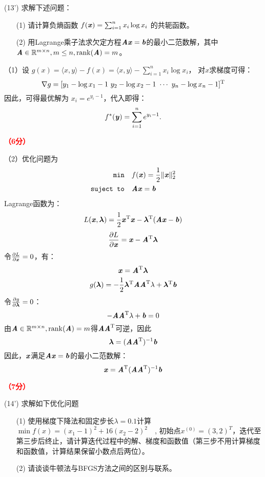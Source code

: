 \documentclass[12pt,a4paper,openany,twoside]{ctexbook}
\begin{document}
\begin{exercise}(13')
	求解下述问题：
	\begin{itemize}
		\item[(1)] 请计算负熵函数 $f(\Vx)=\sum_{i=1}^{n} x_i \log x_i$ 的共轭函数。
		
		
		\item [(2)] 用Lagrange乘子法求欠定方程$ \MA\Vx=\Vb $的最小二范数解，其中$ \MA\in\NR^{m\times n},m\leq n,\rank(\MA)=m $。
	\end{itemize}
\end{exercise}
\begin{Solution}
	（1）设 $g(x) = \langle x,y \rangle-f(x) = \langle x,y \rangle-\sum_{i=1}^{n} x_i \log x_i$，
	对$x$求梯度可得：
	\[
	\nabla g = [y_1-\log x_1 - 1~ y_2-\log x_2 - 1~ \cdots~ y_n-\log x_n - 1]\T
	\]
	因此，可得最优解为 $x_i = e^{y_i - 1}$，代入即得：
	\[
	f^* (\Vy) = \sum_{i=1}^{n} e^{y_i - 1}.
	\]
	
	\hfill \textcolor{red}{\textbf{（6分）}}
	
	（2）优化问题为\[ 	\begin{aligned}
		\texttt{min} \quad & f(\Vx)=\frac{1}{2}\Vert \Vx\Vert_{2}^2 \\
		\texttt{suject to} \quad & \MA\Vx=\Vb
	\end{aligned} \]
	Lagrange函数为：
	\[ L(\Vx,
	\Vlambda)=\frac{1}{2}\Vx\T\Vx-\Vlambda\T(\MA\Vx-\Vb) \]
	\[ \frac{\partial L}{\partial \Vx}= \Vx -\MA\T\Vlambda\]
	令$ \frac{\partial L}{\partial \Vx}=0 $，有：
	\[ \Vx=\MA\T\Vlambda \]
	\[ g(\Vlambda)=-\frac{1}{2}\Vlambda\T\MA\MA\T\lambda+\Vlambda\T\Vb \]
	令$ \frac{\partial g}{\partial \Vlambda}=0  $：
	\[ -\MA\MA\T\lambda+\Vb=0 \]
	由$ \MA\in\NR^{m\times n},\rank(\MA)=m $得$ \MA\MA\T $可逆，因此
	\[ \Vlambda=(\MA\MA\T)^{-1}\Vb \]
	因此，$ \Vx $满足$ \MA\Vx=\Vb $的最小二范数解： \[ \Vx=\MA\T(\MA\MA\T)^{-1}\Vb  \]
	
	\hfill \textcolor{red}{\textbf{（7分）}}
\end{Solution}

\begin{exercise}(14')
	求解如下优化问题
	\begin{itemize}
		\item [(1)] 使用梯度下降法和固定步长$\lambda =0.1$计算$\min f(x)=(x_{1}-1)^{2}+16(x_{2}-2)^{2} \quad $, 初始点$x^{(0)}=(3,2)^{T}$，迭代至第三步后终止，请计算迭代过程中的解、梯度和函数值（第三步不用计算梯度和函数值，计算结果保留小数点后两位）。
		\item[(2)] 请谈谈牛顿法与BFGS方法之间的区别与联系。
	\end{itemize}
\end{exercise}
\end{document}

